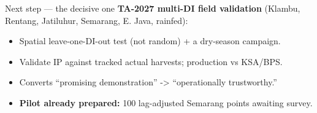 \documentclass[
  ignorenonframetext,
  aspectratio=169,
]{beamer}
\providecommand{\tightlist}{%
  \setlength{\itemsep}{0pt}\setlength{\parskip}{0pt}}
\begin{document}
\begin{frame}{Next step --- the decisive one}
\label{next-step-the-decisive-one}
\textbf{TA-2027 multi-DI field validation} (Klambu, Rentang, Jatiluhur,
Semarang, E. Java, rainfed):

\begin{itemize}
\tightlist
\item
  Spatial leave-one-DI-out test (not random) + a dry-season campaign.
\item
  Validate IP against tracked actual harvests; production vs KSA/BPS.
\item
  Converts ``promising demonstration'' -\textgreater{} ``operationally
  trustworthy.''
\item
  \textbf{Pilot already prepared:} 100 lag-adjusted Semarang points
  awaiting survey.
\end{itemize}
\end{frame}
\end{document}
